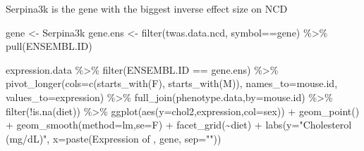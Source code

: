 \documentclass[
]{article}
\newenvironment{Shaded}{\begin{snugshade}}{\end{snugshade}}
\newcommand{\AttributeTok}[1]{\textcolor[rgb]{0.77,0.63,0.00}{#1}}
\newcommand{\FunctionTok}[1]{\textcolor[rgb]{0.00,0.00,0.00}{#1}}
\newcommand{\NormalTok}[1]{#1}
\newcommand{\OtherTok}[1]{\textcolor[rgb]{0.56,0.35,0.01}{#1}}
\newcommand{\SpecialCharTok}[1]{\textcolor[rgb]{0.00,0.00,0.00}{#1}}
\newcommand{\StringTok}[1]{\textcolor[rgb]{0.31,0.60,0.02}{#1}}
\begin{document}
Serpina3k is the gene with the biggest inverse effect size on NCD

\begin{Shaded}
\begin{Highlighting}[]
\NormalTok{gene }\OtherTok{\textless{}{-}} \StringTok{\textquotesingle{}Serpina3k\textquotesingle{}}
\NormalTok{gene.ens }\OtherTok{\textless{}{-}} \FunctionTok{filter}\NormalTok{(twas.data.ncd, symbol}\SpecialCharTok{==}\NormalTok{gene) }\SpecialCharTok{\%\textgreater{}\%} \FunctionTok{pull}\NormalTok{(ENSEMBL.ID)}

\NormalTok{expression.data }\SpecialCharTok{\%\textgreater{}\%}
  \FunctionTok{filter}\NormalTok{(ENSEMBL.ID }\SpecialCharTok{==}\NormalTok{ gene.ens) }\SpecialCharTok{\%\textgreater{}\%}
  \FunctionTok{pivot\_longer}\NormalTok{(}\AttributeTok{cols=}\FunctionTok{c}\NormalTok{(}\FunctionTok{starts\_with}\NormalTok{(}\StringTok{\textquotesingle{}F\textquotesingle{}}\NormalTok{),}
                      \FunctionTok{starts\_with}\NormalTok{(}\StringTok{\textquotesingle{}M\textquotesingle{}}\NormalTok{)),}
               \AttributeTok{names\_to=}\StringTok{\textquotesingle{}mouse.id\textquotesingle{}}\NormalTok{,}
               \AttributeTok{values\_to=}\StringTok{\textquotesingle{}expression\textquotesingle{}}\NormalTok{) }\SpecialCharTok{\%\textgreater{}\%}
  \FunctionTok{full\_join}\NormalTok{(phenotype.data,}\AttributeTok{by=}\StringTok{\textquotesingle{}mouse.id\textquotesingle{}}\NormalTok{) }\SpecialCharTok{\%\textgreater{}\%}
  \FunctionTok{filter}\NormalTok{(}\SpecialCharTok{!}\FunctionTok{is.na}\NormalTok{(diet)) }\SpecialCharTok{\%\textgreater{}\%}
  \FunctionTok{ggplot}\NormalTok{(}\FunctionTok{aes}\NormalTok{(}\AttributeTok{y=}\NormalTok{chol2,expression,}\AttributeTok{col=}\NormalTok{sex)) }\SpecialCharTok{+}
  \FunctionTok{geom\_point}\NormalTok{() }\SpecialCharTok{+}
  \FunctionTok{geom\_smooth}\NormalTok{(}\AttributeTok{method=}\StringTok{\textquotesingle{}lm\textquotesingle{}}\NormalTok{,}\AttributeTok{se=}\NormalTok{F) }\SpecialCharTok{+}
  \FunctionTok{facet\_grid}\NormalTok{(}\SpecialCharTok{\textasciitilde{}}\NormalTok{diet) }\SpecialCharTok{+}
  \FunctionTok{labs}\NormalTok{(}\AttributeTok{y=}\StringTok{"Cholesterol (mg/dL)"}\NormalTok{,}
       \AttributeTok{x=}\FunctionTok{paste}\NormalTok{(}\StringTok{\textquotesingle{}Expression of \textquotesingle{}}\NormalTok{, gene, }\AttributeTok{sep=}\StringTok{""}\NormalTok{))}
\end{Highlighting}
\end{Shaded}
\end{document}

